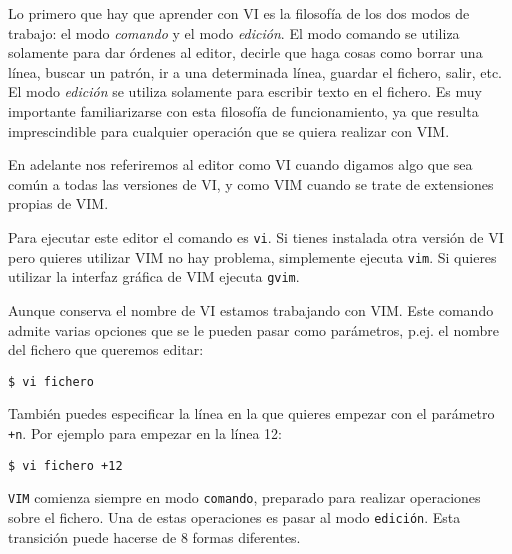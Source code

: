 Lo primero que hay que aprender con {\sf VI} es la filosofía de los dos
modos de  trabajo:  el  modo {\em comando} y  el modo
{\em edición}. El  modo comando se utiliza solamente  para dar órdenes
al editor,  decirle que haga  cosas como  borrar una línea,  buscar un
patrón, ir a una determinada línea, guardar el fichero, salir, etc. El
modo  {\em edición}  se utiliza  solamente para  escribir texto  en el
fichero.  Es  muy  importante  familiarizarse con  esta  filosofía  de
funcionamiento, ya que resulta imprescindible para cualquier operación
que se quiera realizar con {\sf VIM}.

En adelante  nos referiremos  al editor como  {\sf VI}  cuando digamos
algo que sea común a todas las versiones de {\sf VI}, y como {\sf VIM}
cuando se trate de extensiones propias de {\sf VIM}.

Para ejecutar este editor el comando  es {\tt vi}. Si tienes instalada
otra  versión de  {\sf  VI} pero  quieres utilizar  {\sf  VIM} no  hay
problema,  simplemente  ejecuta  {\tt  vim}. Si  quieres  utilizar  la
interfaz gráfica de {\sf VIM} ejecuta {\tt gvim}.

Aunque  conserva el  nombre de  {\sf VI}  estamos trabajando  con {\sf
VIM}. Este comando admite varias opciones  que se le pueden pasar como
parámetros, p.ej. el nombre del fichero que queremos editar:

\begin{verbatim}
$ vi fichero
\end{verbatim}

También puedes especificar  la línea en la que quieres  empezar con el
parámetro {\tt +n}. Por ejemplo para empezar en la línea 12:

\begin{verbatim}
$ vi fichero +12
\end{verbatim}

{\tt  VIM} comienza  siempre  en modo  {\tt  comando}, preparado  para
realizar operaciones  sobre el  fichero. Una  de estas  operaciones es
pasar al modo {\tt edición}. Esta transición puede hacerse de 8 formas 
diferentes.

